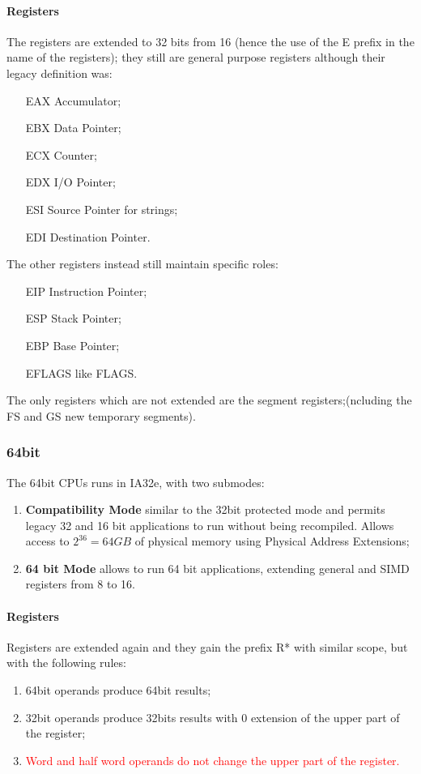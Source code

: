 \documentclass[paper=a4, fontsize=11pt]{report} %
\numberwithin{equation}{section} %
\numberwithin{figure}{section} %
\numberwithin{table}{section} %
\begin{document}
\paragraph{Registers}
The registers are extended to 32 bits from 16 (hence the use of the E prefix in the name of the registers); they still are general purpose registers although their legacy definition was:
\begin{itemize}
	\item[EAX] Accumulator;
	\item[EBX] Data Pointer;
	\item[ECX] Counter;
	\item[EDX] I/O Pointer;
	\item[ESI] Source Pointer for strings;
	\item[EDI] Destination Pointer.
\end{itemize}
The other registers instead still maintain specific roles:
\begin{itemize}
	\item[EIP] Instruction Pointer;
	\item[ESP] Stack Pointer;
	\item[EBP] Base Pointer;
	\item[EFLAGS] like FLAGS.
\end{itemize}
The only registers which are not extended are the segment registers;(ncluding the FS and GS new temporary segments).
\subsubsection{64bit}
The 64bit CPUs runs in IA32e, with two submodes:
\begin{enumerate}
  \item \textbf{Compatibility Mode} similar to the 32bit protected mode and 
	  permits legacy 32 and 16 bit applications to run without being recompiled. 
	  Allows access to $2^{36} = 64GB$ of physical memory using Physical Address 
	  Extensions;
  \item \textbf{64 bit Mode} allows to run 64 bit applications, extending 
	  general and SIMD registers from 8 to 16.
\end{enumerate}
\paragraph{Registers}
Registers are extended again and they gain the prefix R* with similar scope, but with the following rules:
\begin{enumerate}
	\item 64bit operands produce 64bit results;
	\item 32bit operands produce 32bits results with 0 extension of the upper 						part of the register;
	\item \textcolor{red}{Word and half word operands do not change the upper 						part of the register.}
\end{enumerate}
\end{document}

